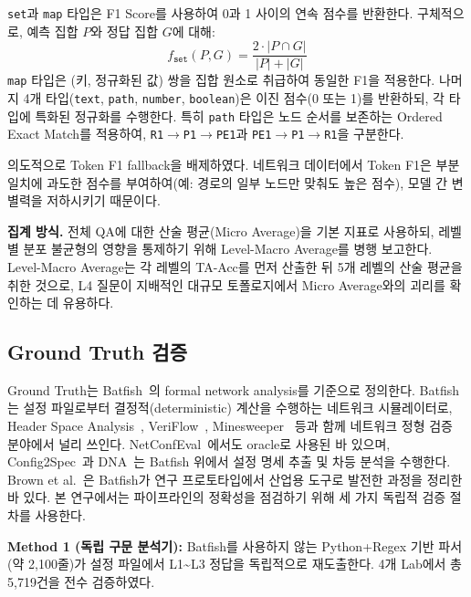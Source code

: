 \documentclass[journal]{IEEEtran}
\begin{document}
\texttt{set}과 \texttt{map} 타입은 F1 Score를 사용하여 0과 1 사이의 연속 점수를 반환한다. 구체적으로, 예측 집합 $P$와 정답 집합 $G$에 대해:
\begin{equation}
  f_{\texttt{set}}(P, G) = \frac{2 \cdot |P \cap G|}{|P| + |G|}
  \label{eq:set-f1}
\end{equation}
\texttt{map} 타입은 (키, 정규화된 값) 쌍을 집합 원소로 취급하여 동일한 F1을 적용한다. 나머지 4개 타입(\texttt{text}, \texttt{path}, \texttt{number}, \texttt{boolean})은 이진 점수(0 또는 1)를 반환하되, 각 타입에 특화된 정규화를 수행한다. 특히 \texttt{path} 타입은 노드 순서를 보존하는 Ordered Exact Match를 적용하여, \texttt{R1$\rightarrow$P1$\rightarrow$PE1}과 \texttt{PE1$\rightarrow$P1$\rightarrow$R1}을 구분한다.

의도적으로 Token F1 fallback을 배제하였다. 네트워크 데이터에서 Token F1은 부분 일치에 과도한 점수를 부여하여(예: 경로의 일부 노드만 맞춰도 높은 점수), 모델 간 변별력을 저하시키기 때문이다.

\textbf{집계 방식.} 전체 QA에 대한 산술 평균(Micro Average)을 기본 지표로 사용하되, 레벨별 분포 불균형의 영향을 통제하기 위해 Level-Macro Average를 병행 보고한다. Level-Macro Average는 각 레벨의 TA-Acc를 먼저 산출한 뒤 5개 레벨의 산술 평균을 취한 것으로, L4 질문이 지배적인 대규모 토폴로지에서 Micro Average와의 괴리를 확인하는 데 유용하다.

\subsection{Ground Truth 검증}
Ground Truth는 Batfish~\cite{ref17}의 formal network analysis를 기준으로 정의한다. Batfish는 설정 파일로부터 결정적(deterministic) 계산을 수행하는 네트워크 시뮬레이터로, Header Space Analysis~\cite{ref22}, VeriFlow~\cite{ref23}, Minesweeper~\cite{ref24} 등과 함께 네트워크 정형 검증 분야에서 널리 쓰인다. NetConfEval~\cite{ref5}에서도 oracle로 사용된 바 있으며, Config2Spec~\cite{ref20}과 DNA~\cite{ref25}는 Batfish 위에서 설정 명세 추출 및 차등 분석을 수행한다. Brown et al.~\cite{ref32}은 Batfish가 연구 프로토타입에서 산업용 도구로 발전한 과정을 정리한 바 있다. 본 연구에서는 파이프라인의 정확성을 점검하기 위해 세 가지 독립적 검증 절차를 사용한다.

\textbf{Method 1 (독립 구문 분석기):} Batfish를 사용하지 않는 Python+Regex 기반 파서(약 2,100줄)가 설정 파일에서 L1\textasciitilde L3 정답을 독립적으로 재도출한다. 4개 Lab에서 총 5,719건을 전수 검증하였다.
\end{document}
